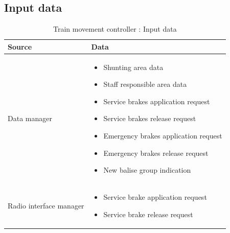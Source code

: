 \documentclass[nocc]{template/openetcs_report}
\begin{document}
\subsection{Input data}
			\begin{longtable}{|l|l|}
				\caption{Train movement controller : Input data}\\ 
				\hline
				
					\begin{minipage}[t]{0.35\linewidth} \textbf{Source}	\end{minipage} 
				&	\begin{minipage}[t]{0.65\linewidth} \textbf{Data} \end{minipage} \\
				
				\hline
																																									
					\begin{minipage}[t]{0.35\linewidth} Data manager	\end{minipage} 
				&	\begin{minipage}[t]{0.65\linewidth}
						\begin{itemize}
							\item Shunting area data
							\item Staff responsible area data
							\item Service brakes application request
							\item Service brakes release request
							\item Emergency brakes application request
							\item Emergency brakes release request
							\item New balise group indication
						\end{itemize}
					\end{minipage} \\
				
				\hline
				
					\begin{minipage}[t]{0.35\linewidth} Radio interface manager	\end{minipage} 
				&	\begin{minipage}[t]{0.65\linewidth}
						\begin{itemize}
							\item Service brake application request
							\item Service brake release request
						\end{itemize}			
					\end{minipage} \\
				

\end{longtable}
\end{document}
